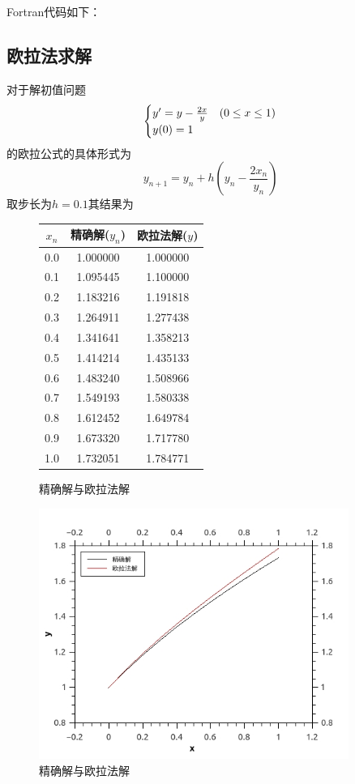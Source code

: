 Fortran代码如下：




\subsection{欧拉法求解}
对于解初值问题
$$\begin{cases}y\rq{}=y-\frac{2x}{y} &(0 \le x \le 1)\\ y(0)=1\end{cases}$$
的欧拉公式的具体形式为
$$y_{n+1}=y_n+h(y_n-\frac{2x_n}{y_n})$$
取步长为$h=0.1$其结果为

\begin{figure}[htb]
\begin{minipage}[b]{0.5\textwidth}
\centering
\begin{tabular}{c|c|c}
$x_n$ &       精确解($y_n$)   & 欧拉法解($y$)  \\
\hline
 0.0  &      1.000000       &	1.000000\\
 0.1	&	1.095445 	&	1.100000\\
0.2	&	1.183216 	&	1.191818\\
0.3	&	1.264911 	&	1.277438\\
0.4	&	1.341641	&	1.358213\\
0.5	&	1.414214	&	1.435133\\
0.6	&	1.483240	&	1.508966\\
0.7	&	1.549193	&	1.580338\\
0.8	&	1.612452	&	1.649784\\
0.9	&	1.673320	&	1.717780\\
1.0	&	1.732051	&	1.784771\\
\end{tabular}
\caption{精确解与欧拉法解}
\end{minipage}%
\begin{minipage}[b]{0.5\textwidth}
\centering
\includegraphics[width=0.9\textwidth]{program/numerical_analysis_examples/euler_method.jpeg}
\caption{精确解与欧拉法解}
\label{fig:by:table}
\end{minipage}
\end{figure}

